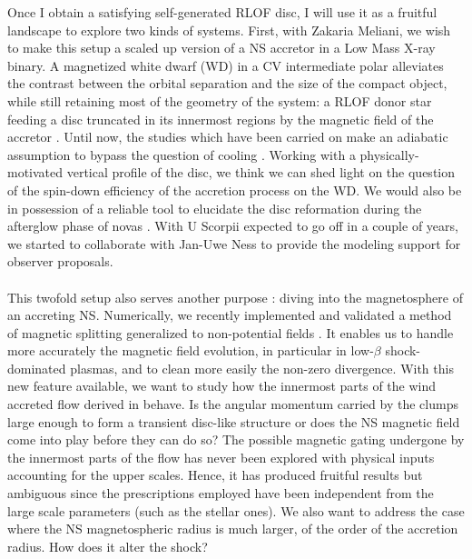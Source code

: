 \documentclass[a4paper,12pt,onecolumn]{article}
\begin{document}
\indent Once I obtain a satisfying self-generated RLOF disc, I will use it as a fruitful landscape to explore two kinds of systems. First, with Zakaria Meliani, we wish to make this setup a scaled up version of a NS accretor in a Low Mass X-ray binary. A magnetized white dwarf (WD) in a CV intermediate polar alleviates the contrast between the orbital separation and the size of the compact object, while still retaining most of the geometry of the system: a RLOF donor star feeding a disc truncated in its innermost regions by the magnetic field of the accretor \citep{Ghosh1977}. Until now, the studies which have been carried on make an adiabatic assumption to bypass the question of cooling \citep{Ju2017}. Working with a physically-motivated vertical profile of the disc, we think we can shed light on the question of the spin-down efficiency of the accretion process on the WD. We would also be in possession of a reliable tool to elucidate the disc reformation during the afterglow phase of novas \citep{Ness2012}. With U Scorpii expected to go off in a couple of years, we started to collaborate with Jan-Uwe Ness to provide the modeling support for observer proposals.\\ \\
\indent This twofold setup also serves another purpose : diving into the magnetosphere of an accreting NS. Numerically, we recently implemented and validated a method of magnetic splitting generalized to non-potential fields \citep{Xia2017}. It enables us to handle more accurately the magnetic field evolution, in particular in low-$\beta$ shock-dominated plasmas, and to clean more easily the non-zero divergence. With this new feature available, we want to study how the innermost parts of the wind accreted flow derived in \cite{ElMellah} behave. Is the angular momentum carried by the clumps large enough to form a transient disc-like structure or does the NS magnetic field come into play before they can do so? The possible magnetic gating undergone by the innermost parts of the flow has never been explored with physical inputs accounting for the upper scales. Hence, it has produced fruitful results but ambiguous since the prescriptions employed have been independent from the large scale parameters (such as the stellar ones). We also want to address the case where the NS magnetospheric radius is much larger, of the order of the accretion radius. How does it alter the shock?  \\ \\

\end{document}
